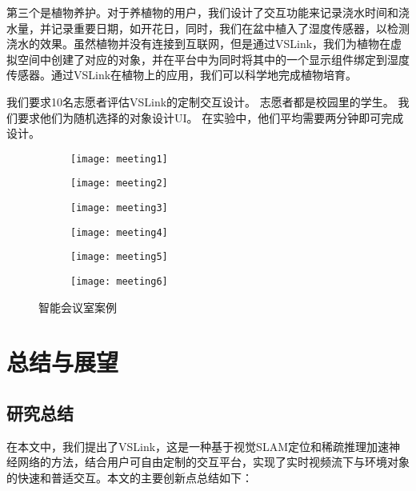 第三个是植物养护。对于养植物的用户，我们设计了交互功能来记录浇水时间和浇水量，并记录重要日期，如开花日，同时，我们在盆中植入了湿度传感器，以检测浇水的效果。虽然植物并没有连接到互联网，但是通过VSLink，我们为植物在虚拟空间中创建了对应的对象，并在平台中为同时将其中的一个显示组件绑定到湿度传感器。通过VSLink在植物上的应用，我们可以科学地完成植物培育。

我们要求10名志愿者评估VSLink的定制交互设计。
志愿者都是校园里的学生。
我们要求他们为随机选择的对象设计UI。
在实验中，他们平均需要两分钟即可完成设计。



\begin{figure}[htbp]
	\centering
	\begin{subfigure}{.48\linewidth}
		\texttt{[image: meeting1]}
		\caption{}
	\end{subfigure}
	\quad
	\begin{subfigure}{.48\linewidth}
		\texttt{[image: meeting2]}
		\caption{}
	\end{subfigure}
	\quad
	\begin{subfigure}{.48\linewidth}
		\texttt{[image: meeting3]}
		\caption{}
	\end{subfigure}
	\quad
	\begin{subfigure}{.48\linewidth}
		\texttt{[image: meeting4]}
		\caption{}
	\end{subfigure}
	\quad
	\begin{subfigure}{.48\linewidth}
		\texttt{[image: meeting5]}
		\caption{}
	\end{subfigure}
	\quad
	\begin{subfigure}{.48\linewidth}
		\texttt{[image: meeting6]}
		\caption{}
	\end{subfigure}
	\caption{智能会议室案例}\label{fig:meeting}
\end{figure}



\chapter{总结与展望}
\label{chap:sum}
\section{研究总结}
在本文中，我们提出了VSLink，这是一种基于视觉SLAM定位和稀疏推理加速神经网络的方法，结合用户可自由定制的交互平台，实现了实时视频流下与环境对象的快速和普适交互。本文的主要创新点总结如下：

